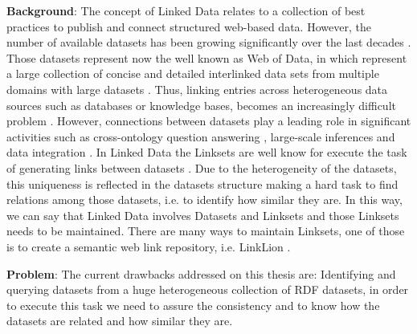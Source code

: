 \textbf{Background}:
The concept of Linked Data relates to a collection of best practices to publish and connect structured web-based data. However, the number of available datasets has been growing significantly over the last decades \cite{bizer2011linked}. Those datasets represent now the well known as Web of Data, in which represent a large collection of concise and detailed interlinked data sets from multiple domains with large datasets \cite{saleem2013linked}. Thus, linking entries across heterogeneous data sources such as databases or knowledge bases, becomes an increasingly difficult problem \cite{valdestilhas2017high, NGAU11, saeedi2018scalable}. However, connections between datasets play a leading role in significant activities such as cross-ontology question answering \cite{lopez2009cross}, large-scale inferences \cite{urbani2010owl} and data integration \cite{rahm2016case}. In Linked Data the Linksets are well know for execute the task of generating links between datasets \cite{NGAU11}. Due to the heterogeneity of the datasets, this uniqueness is reflected in the datasets structure making a hard task to find relations among those datasets, i.e.  to identify how similar they are. In this way, we can say that Linked Data involves Datasets and Linksets and those Linksets needs to be maintained. There are many ways to maintain Linksets, one of those is to create a semantic web link repository, i.e. LinkLion \cite{linklion2014}.

\textbf{Problem}:
The current drawbacks addressed on this thesis are: Identifying and querying datasets from a huge heterogeneous collection of RDF datasets, in order to execute this task we need to assure the consistency and to know how the datasets are related and how similar they are. 

